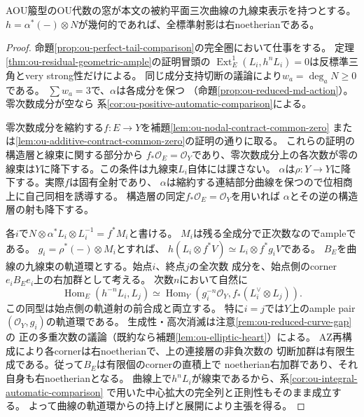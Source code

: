 \begin{lemma}[幾何的移動の零次数成分を許す比較]
\label{lem:ou-nef-corner-comparison}
AOU箙型のOU代数の窓が本文の被約平面三次曲線の九線束表示を持つとする。
$h=\alpha^*(-)\otimes N$が幾何的であれば、全標準射影は右noetherianである。
\end{lemma}
\begin{proof}
命題\ref{prop:ou-perfect-tail-comparison}の完全圏において仕事をする。
定理\ref{thm:ou-residual-geometric-ample}の証明冒頭の
$\operatorname{Ext}^1_E(L_i,h^nL_i)=0$は反標準三角とvery strong性だけによる。
同じ成分支持切断の議論により$w_a=\deg_a N\ge0$である。
$\sum w_a=3$で、$\alpha$は各成分を保つ
（命題\ref{prop:ou-reduced-md-action}）。零次数成分が空なら
系\ref{cor:ou-positive-automatic-comparison}による。

零次数成分を縮約する$f:E\to Y$を補題\ref{lem:ou-nodal-contract-common-zero}
または\ref{lem:ou-additive-contract-common-zero}の証明の通りに取る。
これらの証明の構造層と線束に関する部分から
$f_*\mathcal O_E=\mathcal O_Y$であり、零次数成分上の各次数が零の
線束は$Y$に降下する。この条件は九線束$L_i$自体には課さない。
$\alpha$は$\rho:Y\to Y$に降下する。実際$f$は固有全射であり、
$\alpha$は縮約する連結部分曲線を保つので位相商上に自己同相を誘導する。
構造層の同定$f_*\mathcal O_E=\mathcal O_Y$を用いれば
$\alpha$とその逆の構造層の射も降下する。

各$i$で$N\otimes\alpha^*L_i\otimes L_i^{-1}=f^*M_i$と書ける。
$M_i$は残る全成分で正次数なのでampleである。
$g_i=\rho^*(-)\otimes M_i$とすれば、
$h(L_i\otimes f^*V)\simeq L_i\otimes f^*g_iV$である。
$B_E$を曲線の九線束の軌道環とする。始点$i$、終点$j$の全次数
成分を、始点側のcorner $e_iB_Ee_i$上の右加群として考える。
次数$n$において自然に
\[
 \operatorname{Hom}_E(h^{-n}L_i,L_j)
 \simeq\operatorname{Hom}_Y(g_i^{-n}\mathcal O_Y,
                      f_*(L_i^\vee\otimes L_j)).
\]
この同型は始点側の軌道射の前合成と両立する。
特に$i=j$では$Y$上のample pair $(\mathcal O_Y,g_i)$の軌道環である。
生成性・高次消滅は注意\ref{rem:ou-reduced-curve-gap}の
正の多重次数の議論（既約なら補題\ref{lem:ou-elliptic-heart}）による。
AZ再構成により各cornerは右noetherianで、上の連接層の非負次数の
切断加群は有限生成である。従って$B_E$は有限個のcornerの直積上で
noetherian右加群であり、それ自身も右noetherianとなる。
曲線上で$h^nL_i$が線束であるから、系\ref{cor:ou-integral-automatic-comparison}
で用いた中心拡大の完全列と正則性もそのまま成立する。
よって曲線の軌道環からの持上げと展開により主張を得る。
\end{proof}


